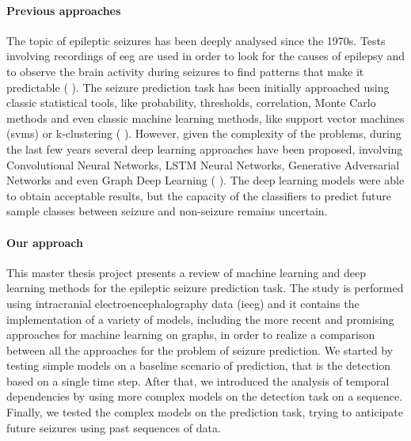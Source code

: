 \paragraph{Previous approaches} The topic of epileptic seizures has been deeply analysed since the 1970s. Tests involving recordings of \acs{eeg} are used in order to look for the causes of epilepsy and to observe the brain activity during seizures to find patterns that make it predictable (\cite{LancetNeurol:Seizurelikelihood} \cite{CurrOpinNeurol:Preseizure}). The seizure prediction task has been initially approached using classic statistical tools, like probability, thresholds, correlation, Monte Carlo methods and even classic machine learning methods, like support vector machines (\acsp{svm}) or k-clustering (\cite{Brain:Longroad} \cite{JClinNeurophysiol:stateoftheart} \cite{IEEE:nonlineareeg} \cite{ClinicalNeurophysiology:chance} \cite{NeuroscienceMethod:therapeuticdevices} \cite{arXiv:VLSIBCISystem} \cite{ComputMathMethodsMed:mlmethods}). However, given the complexity of the problems, during the last few years several deep learning approaches have been proposed, involving Convolutional Neural Networks, LSTM Neural Networks, Generative Adversarial Networks and even Graph Deep Learning (\cite{CurrOpinNeurol:review} \cite{arXiv:earlyseizuredetection} \cite{IEEE:graphtheory} \cite{NeuralNetworks:cnn} \cite{arXiv:quantitativeanalysis} \cite{arXiv:gan}). The deep learning models were able to obtain acceptable results, but the capacity of the classifiers to predict future sample classes between seizure and non-seizure remains uncertain.

\paragraph{Our approach} This master thesis project presents a review of machine learning and deep learning methods for the epileptic seizure prediction task. The study is performed using intracranial electroencephalography data (\acs{ieeg}) and it contains the implementation of a variety of models, including the more recent and promising approaches for machine learning on graphs, in order to realize a comparison between all the approaches for the problem of seizure prediction. We started by testing simple models on a baseline scenario of prediction, that is the detection based on a single time step. After that, we introduced the analysis of temporal dependencies by using more complex models on the detection task on a sequence. Finally, we tested the complex models on the prediction task, trying to anticipate future seizures using past sequences of data.

